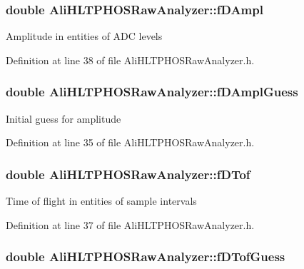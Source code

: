 \subsubsection{\setlength{\rightskip}{0pt plus 5cm}double {\bf Ali\-HLTPHOSRaw\-Analyzer::f\-DAmpl}\hspace{0.3cm}{\tt  [protected, inherited]}}\label{classAliHLTPHOSRawAnalyzer_AliHLTPHOSRawAnalyzerPeakFinderp6}


Amplitude in entities of ADC levels 

Definition at line 38 of file Ali\-HLTPHOSRaw\-Analyzer.h.
\subsubsection{\setlength{\rightskip}{0pt plus 5cm}double {\bf Ali\-HLTPHOSRaw\-Analyzer::f\-DAmpl\-Guess}\hspace{0.3cm}{\tt  [protected, inherited]}}\label{classAliHLTPHOSRawAnalyzer_AliHLTPHOSRawAnalyzerPeakFinderp3}


Initial guess for amplitude 

Definition at line 35 of file Ali\-HLTPHOSRaw\-Analyzer.h.
\subsubsection{\setlength{\rightskip}{0pt plus 5cm}double {\bf Ali\-HLTPHOSRaw\-Analyzer::f\-DTof}\hspace{0.3cm}{\tt  [protected, inherited]}}\label{classAliHLTPHOSRawAnalyzer_AliHLTPHOSRawAnalyzerPeakFinderp5}


Time of flight in entities of sample intervals 

Definition at line 37 of file Ali\-HLTPHOSRaw\-Analyzer.h.
\subsubsection{\setlength{\rightskip}{0pt plus 5cm}double {\bf Ali\-HLTPHOSRaw\-Analyzer::f\-DTof\-Guess}\hspace{0.3cm}{\tt  [protected, inherited]}}\label{classAliHLTPHOSRawAnalyzer_AliHLTPHOSRawAnalyzerPeakFinderp2}


